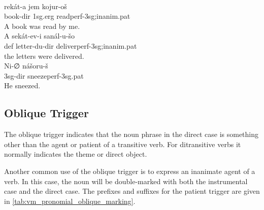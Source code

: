 \documentclass[grammar]{subfiles}
\begin{document}
\begin{exe}
  \ex {}\\
  \gll rekát-a jem kojur-oš\\
  book-\acs{dir} \acs{1sg}.\acs{erg} read\bs\acs{perf}-\acs{3sg};\acs{inanim}.\acs{pat}\\
  \glt A book was read by me.
  \ex {}\\
  \gll A sekát-ev-i sanál-u-šo\\
  \acs{def} letter-\acs{du}-\acs{dir} deliver\bs\acs{perf}-\acs{3sg};\acs{inanim}.\acs{pat}\\
  \glt [Both of] the letters were delivered.
  \ex {}\\
  \gll Ni-∅ nášoru-š\\
  \acs{3sg}-\acs{dir} sneeze\bs\acs{perf}-\acs{3sg}.\acs{pat}\\
  \glt He sneezed.
\end{exe}

\subsection{Oblique Trigger}
\label{ssec:vm_obl_trigger}

The oblique trigger indicates that the noun phrase in the direct case is
something other than the agent or patient of a transitive verb.  For
ditransitive verbs it normally indicates the theme or direct object.

Another common use of the oblique trigger is to express an inanimate agent of a
verb. In this case, the noun will be double-marked with both the instrumental
case and the direct case.  The prefixes and suffixes for the patient trigger
are given in \cref{tab:vm_pronomial_oblique_marking}.
\end{document}
